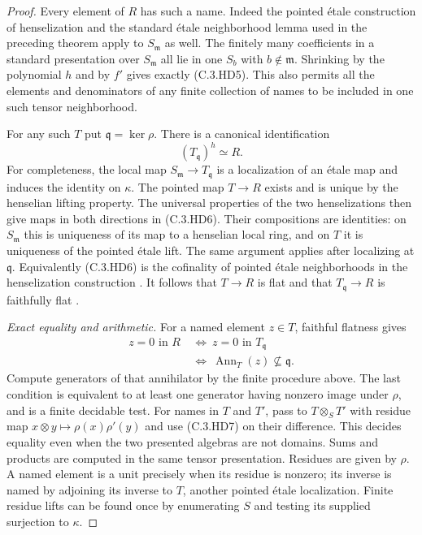 \begin{proof}
Every element of $R$ has such a name.
Indeed the pointed \'etale construction of
henselization and the standard \'etale neighborhood
lemma used in the preceding theorem apply to
$S_{\mathfrak m}$ as well.  The finitely many
coefficients in a standard presentation over
$S_{\mathfrak m}$ all lie in one $S_b$ with
$b\notin\mathfrak m$.  Shrinking by the polynomial
$h$ and by $f'$ gives exactly (C.3.HD5).
This also permits all the elements and denominators
of any finite collection of names to be included
in one such tensor neighborhood.

For any such $T$ put $\mathfrak q=\ker\rho$.
There is a canonical identification
\[
                  (T_{\mathfrak q})^h\simeq R.           \tag{C.3.HD6}
\]
For completeness, the local map
$S_{\mathfrak m}\to T_{\mathfrak q}$ is a localization
of an \'etale map and induces the identity on
$\kappa$.  The pointed map $T\to R$ exists and
is unique by the henselian lifting property.
The universal properties of the two henselizations
then give maps in both directions in (C.3.HD6).
Their compositions are identities: on $S_{\mathfrak m}$
this is uniqueness of its map to a henselian local
ring, and on $T$ it is uniqueness of the pointed
\'etale lift.  The same argument applies after
localizing at $\mathfrak q$.
Equivalently (C.3.HD6) is the cofinality of pointed
\'etale neighborhoods in the henselization construction
\cite[Section 10.155; also the proof of Lemma 15.46.3(c)]
 {C-StacksHenselianEffective}.
It follows that $T\to R$ is flat and that
$T_{\mathfrak q}\to R$ is faithfully flat
\cite[Lemma 15.46.1(1), Tag 07QL]{C-StacksHenselianEffective}.

\emph{Exact equality and arithmetic.}
For a named element $z\in T$, faithful flatness gives
\[
 \begin{split}
 z=0\text{ in }R
 &\ \Longleftrightarrow\ z=0\text{ in }T_{\mathfrak q}\\
 &\ \Longleftrightarrow\
       \operatorname{Ann}_T(z)\not\subseteq\mathfrak q.
 \end{split}                                             \tag{C.3.HD7}
\]
Compute generators of that annihilator by the finite
procedure above.  The last condition is equivalent
to at least one generator having nonzero image under
$\rho$, and is a finite decidable test.
For names in $T$ and $T'$, pass to
$T\otimes_S T'$ with residue map
$x\otimes y\mapsto\rho(x)\rho'(y)$ and use (C.3.HD7)
on their difference.  This decides equality even
when the two presented algebras are not domains.
Sums and products are computed in the same tensor
presentation.  Residues are given by $\rho$.
A named element is a unit precisely when its residue
is nonzero; its inverse is named by adjoining its
inverse to $T$, another pointed \'etale localization.
Finite residue lifts can be found once by enumerating
$S$ and testing its supplied surjection to $\kappa$.


\end{proof}
